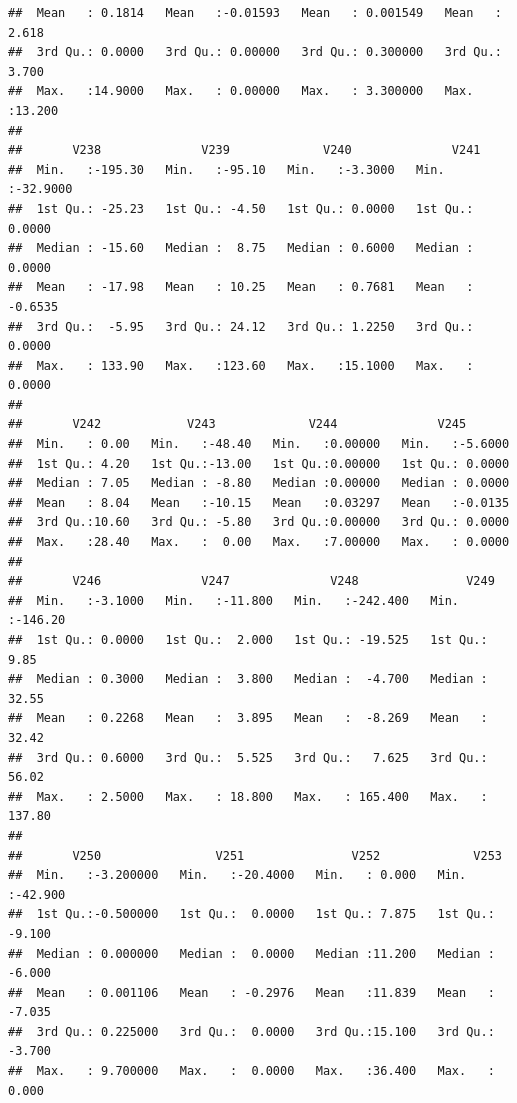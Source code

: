 \documentclass[
]{article}
\begin{document}
\begin{verbatim}
##  Mean   : 0.1814   Mean   :-0.01593   Mean   : 0.001549   Mean   : 2.618  
##  3rd Qu.: 0.0000   3rd Qu.: 0.00000   3rd Qu.: 0.300000   3rd Qu.: 3.700  
##  Max.   :14.9000   Max.   : 0.00000   Max.   : 3.300000   Max.   :13.200  
##                                                                           
##       V238              V239             V240              V241         
##  Min.   :-195.30   Min.   :-95.10   Min.   :-3.3000   Min.   :-32.9000  
##  1st Qu.: -25.23   1st Qu.: -4.50   1st Qu.: 0.0000   1st Qu.:  0.0000  
##  Median : -15.60   Median :  8.75   Median : 0.6000   Median :  0.0000  
##  Mean   : -17.98   Mean   : 10.25   Mean   : 0.7681   Mean   : -0.6535  
##  3rd Qu.:  -5.95   3rd Qu.: 24.12   3rd Qu.: 1.2250   3rd Qu.:  0.0000  
##  Max.   : 133.90   Max.   :123.60   Max.   :15.1000   Max.   :  0.0000  
##                                                                         
##       V242            V243             V244              V245        
##  Min.   : 0.00   Min.   :-48.40   Min.   :0.00000   Min.   :-5.6000  
##  1st Qu.: 4.20   1st Qu.:-13.00   1st Qu.:0.00000   1st Qu.: 0.0000  
##  Median : 7.05   Median : -8.80   Median :0.00000   Median : 0.0000  
##  Mean   : 8.04   Mean   :-10.15   Mean   :0.03297   Mean   :-0.0135  
##  3rd Qu.:10.60   3rd Qu.: -5.80   3rd Qu.:0.00000   3rd Qu.: 0.0000  
##  Max.   :28.40   Max.   :  0.00   Max.   :7.00000   Max.   : 0.0000  
##                                                                      
##       V246              V247              V248               V249        
##  Min.   :-3.1000   Min.   :-11.800   Min.   :-242.400   Min.   :-146.20  
##  1st Qu.: 0.0000   1st Qu.:  2.000   1st Qu.: -19.525   1st Qu.:   9.85  
##  Median : 0.3000   Median :  3.800   Median :  -4.700   Median :  32.55  
##  Mean   : 0.2268   Mean   :  3.895   Mean   :  -8.269   Mean   :  32.42  
##  3rd Qu.: 0.6000   3rd Qu.:  5.525   3rd Qu.:   7.625   3rd Qu.:  56.02  
##  Max.   : 2.5000   Max.   : 18.800   Max.   : 165.400   Max.   : 137.80  
##                                                                          
##       V250                V251               V252             V253        
##  Min.   :-3.200000   Min.   :-20.4000   Min.   : 0.000   Min.   :-42.900  
##  1st Qu.:-0.500000   1st Qu.:  0.0000   1st Qu.: 7.875   1st Qu.: -9.100  
##  Median : 0.000000   Median :  0.0000   Median :11.200   Median : -6.000  
##  Mean   : 0.001106   Mean   : -0.2976   Mean   :11.839   Mean   : -7.035  
##  3rd Qu.: 0.225000   3rd Qu.:  0.0000   3rd Qu.:15.100   3rd Qu.: -3.700  
##  Max.   : 9.700000   Max.   :  0.0000   Max.   :36.400   Max.   :  0.000  

\end{verbatim}
\end{document}
